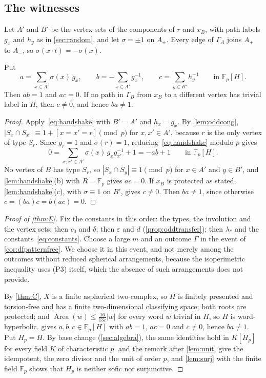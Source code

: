 \documentclass[11pt]{article}
\theoremstyle{definition}
\theoremstyle{plain}
\newcommand{\F}{\mathbb{F}}
\newcommand{\eps}{\varepsilon}
\newcommand{\Area}{\operatorname{Area}}
\begin{document}
\subsection{The witnesses}

Let $A'$ and $B'$ be the vertex sets of the components of $r$ and $x_B$, with path labels $g_x$ and $h_y$ as in \cref{sec:random}, and let $\sigma=\pm1$ on $A_\pm$. Every edge of $\Gamma_A$ joins $A_+$ to $A_-$, so $\sigma(x\cdot t)=-\sigma(x)$.

\begin{proposition}\label{prop:oddwitness}
Put
\[
a=\sum_{x\in A'}\sigma(x)\,g_x,\qquad b=-\sum_{x\in A'}g_x^{-1},\qquad c=\sum_{y\in B'}h_y^{-1}\qquad\text{in }\F_p[H].
\]
Then $ab=1$ and $ac=0$. If no path in $\Gamma_B$ from $x_B$ to a different vertex has trivial label in $H$, then $c\neq0$, and hence $ba\neq1$.
\end{proposition}

\begin{proof}
Apply~\eqref{eq:handshake} with $B'=A'$ and $h_x=g_x$. By \cref{lem:oddcong}, $|S_x\cap S_{x'}|\equiv1+[x=x'=r]\pmod p$ for $x,x'\in A'$, because $r$ is the only vertex of type $S_r$. Since $g_r=1$ and $\sigma(r)=1$, reducing~\eqref{eq:handshake} modulo $p$ gives
\[
0=\sum_{x,x'\in A'}\sigma(x)\,g_xg_{x'}^{-1}+1=-ab+1\qquad\text{in }\F_p[H].
\]
No vertex of $B$ has type $S_r$, so $|S_x\cap S_y|\equiv1\pmod p$ for $x\in A'$ and $y\in B'$, and \cref{lem:handshake}(b) with $R=\F_p$ gives $ac=0$. If $x_B$ is protected as stated, \cref{lem:handshake}(c), with $\sigma\equiv1$ on $B'$, gives $c\neq0$. Then $ba\neq1$, since otherwise $c=(ba)c=b(ac)=0$.
\end{proof}

\begin{proof}[Proof of \cref{thm:E}]
Fix the constants in this order: the types, the involution and the vertex sets; then $c_0$ and $\delta$; then $\eps$ and $d$ (\cref{prop:oddtransfer}); then $\lambda_*$ and the constants~\eqref{eq:constants}. Choose a large $m$ and an outcome $\Gamma$ in the event of \cref{cor:dfpatternfree}. We choose it in this event, and not merely among the outcomes without reduced spherical arrangements, because the isoperimetric inequality uses (P3) itself, which the absence of such arrangements does not provide.

By \cref{thm:C}, $X$ is a finite aspherical two-complex, so $H$ is finitely presented and torsion-free and has a finite two-dimensional classifying space; both roots are protected; and $\Area(w)\le\frac{16}{13\eps}|w|$ for every word $w$ trivial in $H$, so $H$ is word-hyperbolic.  gives $a,b,c\in\F_p[H]$ with $ab=1$, $ac=0$ and $c\neq0$, hence $ba\neq1$. Put $H_p=H$. By base change (\cref{sec:algebra}), the same identities hold in $K[H_p]$ for every field $K$ of characteristic $p$.  and the remark after \cref{lem:unit} give the idempotent, the zero divisor and the unit of order $p$, and \cref{lem:surj} with the finite field $\F_p$ shows that $H_p$ is neither sofic nor surjunctive.
\end{proof}
\end{document}
